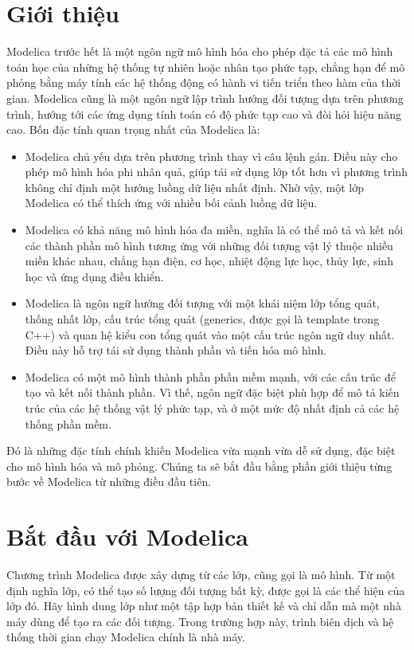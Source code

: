 \section{Giới thiệu}
Modelica trước hết là một ngôn ngữ mô hình hóa cho phép đặc tả các mô hình toán học của những hệ thống tự nhiên hoặc nhân tạo phức tạp, chẳng hạn để mô phỏng bằng máy tính các hệ thống động có hành vi tiến triển theo hàm của thời gian. Modelica cũng là một ngôn ngữ lập trình hướng đối tượng dựa trên phương trình, hướng tới các ứng dụng tính toán có độ phức tạp cao và đòi hỏi hiệu năng cao. Bốn đặc tính quan trọng nhất của Modelica là:
\begin{itemize}
\item Modelica chủ yếu dựa trên phương trình thay vì câu lệnh gán. Điều này cho phép mô hình hóa phi nhân quả, giúp tái sử dụng lớp tốt hơn vì phương trình không chỉ định một hướng luồng dữ liệu nhất định. Nhờ vậy, một lớp Modelica có thể thích ứng với nhiều bối cảnh luồng dữ liệu.
\item Modelica có khả năng mô hình hóa đa miền, nghĩa là có thể mô tả và kết nối các thành phần mô hình tương ứng với những đối tượng vật lý thuộc nhiều miền khác nhau, chẳng hạn điện, cơ học, nhiệt động lực học, thủy lực, sinh học và ứng dụng điều khiển.
\item Modelica là ngôn ngữ hướng đối tượng với một khái niệm lớp tổng quát, thống nhất lớp, cấu trúc tổng quát (generics, được gọi là template trong C++) và quan hệ kiểu con tổng quát vào một cấu trúc ngôn ngữ duy nhất. Điều này hỗ trợ tái sử dụng thành phần và tiến hóa mô hình.
\item Modelica có một mô hình thành phần phần mềm mạnh, với các cấu trúc để tạo và kết nối thành phần. Vì thế, ngôn ngữ đặc biệt phù hợp để mô tả kiến trúc của các hệ thống vật lý phức tạp, và ở một mức độ nhất định cả các hệ thống phần mềm.
\end{itemize}

Đó là những đặc tính chính khiến Modelica vừa mạnh vừa dễ sử dụng, đặc biệt cho mô hình hóa và mô phỏng. Chúng ta sẽ bắt đầu bằng phần giới thiệu từng bước về Modelica từ những điều đầu tiên.

\section{Bắt đầu với Modelica}
Chương trình Modelica được xây dựng từ các lớp, cũng gọi là mô hình. Từ một định nghĩa lớp, có thể tạo số lượng đối tượng bất kỳ, được gọi là các thể hiện của lớp đó. Hãy hình dung lớp như một tập hợp bản thiết kế và chỉ dẫn mà một nhà máy dùng để tạo ra các đối tượng. Trong trường hợp này, trình biên dịch và hệ thống thời gian chạy Modelica chính là nhà máy.


